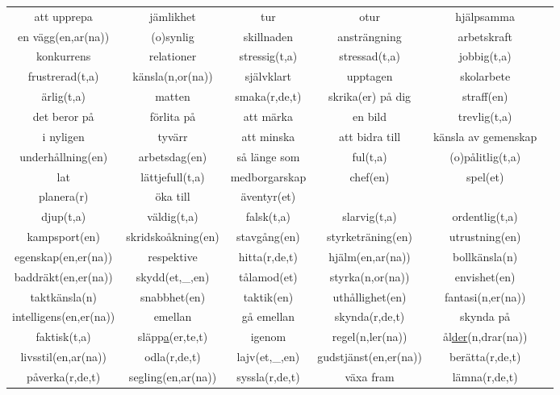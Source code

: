 \begin{center}
    \begin{adjustwidth}{-2.2cm}{}
        \begin{tabular}{|c c c c c c|}
            \hline
            att upprepa & jämlikhet & tur & otur & hjälpsamma & \\
            en vägg(en,ar(na)) & (o)synlig & skillnaden & ansträngning & arbetskraft & \\
            konkurrens & relationer & stressig(t,a) & stressad(t,a) & jobbig(t,a) & \\
            frustrerad(t,a) & känsla(n,or(na)) & självklart & upptagen & skolarbete & \\
            ärlig(t,a) & matten & smaka(r,de,t) & skrika(er) på dig & straff(en) & \\
            det beror på & förlita på & att märka & en bild & trevlig(t,a) & \\
            i nyligen & tyvärr & att minska & att bidra till & känsla av gemenskap & \\
            underhållning(en) & arbetsdag(en) & så länge som & ful(t,a) & (o)pålitlig(t,a) & \\
            lat & lättjefull(t,a) & medborgarskap & chef(en) & spel(et) & \\
            planera(r) & öka till & äventyr(et) &  &  & \\
            djup(t,a) & väldig(t,a) & falsk(t,a) & slarvig(t,a) & ordentlig(t,a) & \\
            kampsport(en) & skridskoåkning(en) & stavgång(en) & styrketräning(en) & utrustning(en) & \\
            egenskap(en,er(na)) & respektive & hitta(r,de,t) & hjälm(en,ar(na)) & bollkänsla(n) & \\
            baddräkt(en,er(na)) & skydd(et,\_,en) & tålamod(et) & styrka(n,or(na)) & envishet(en) & \\
            taktkänsla(n) & snabbhet(en) & taktik(en) & uthållighet(en) & fantasi(n,er(na)) & \\
            intelligens(en,er(na)) & emellan & gå emellan & skynda(r,de,t) & skynda på & \\
            faktisk(t,a) & släpp\underline{a}(er,te,t) & igenom & regel(n,ler(na)) & ål\underline{der}(n,drar(na)) & \\
            livsstil(en,ar(na)) & odla(r,de,t) & lajv(et,\_,en) & gudstjänst(en,er(na)) & berätta(r,de,t) & \\
            påverka(r,de,t) & segling(en,ar(na)) & syssla(r,de,t) & växa fram & lämna(r,de,t) & \\

\end{tabular}
\end{adjustwidth}
\end{center}
